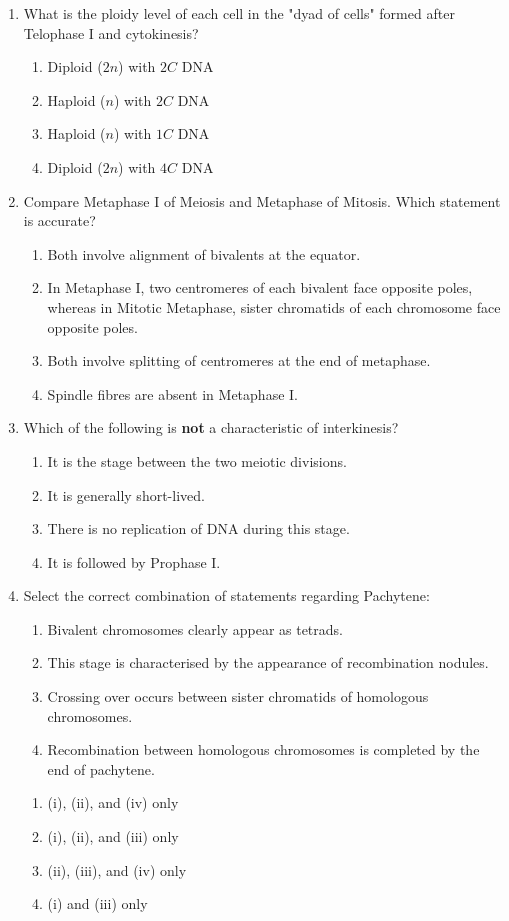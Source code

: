 \documentclass[11pt,a4paper]{article}
\begin{document}
\begin{enumerate}[label=\textbf{\arabic*.}]
\item What is the ploidy level of each cell in the "dyad of cells" formed after Telophase I and cytokinesis?
\begin{enumerate}[label=(\Alph*)]
    \item Diploid ($2n$) with $2C$ DNA
    \item Haploid ($n$) with $2C$ DNA
    \item Haploid ($n$) with $1C$ DNA
    \item Diploid ($2n$) with $4C$ DNA
\end{enumerate}

\item Compare Metaphase I of Meiosis and Metaphase of Mitosis. Which statement is accurate?
\begin{enumerate}[label=(\Alph*)]
    \item Both involve alignment of bivalents at the equator.
    \item In Metaphase I, two centromeres of each bivalent face opposite poles, whereas in Mitotic Metaphase, sister chromatids of each chromosome face opposite poles.
    \item Both involve splitting of centromeres at the end of metaphase.
    \item Spindle fibres are absent in Metaphase I.
\end{enumerate}

\item Which of the following is \textbf{not} a characteristic of interkinesis?
\begin{enumerate}[label=(\Alph*)]
    \item It is the stage between the two meiotic divisions.
    \item It is generally short-lived.
    \item There is no replication of DNA during this stage.
    \item It is followed by Prophase I.
\end{enumerate}

\item Select the correct combination of statements regarding Pachytene:
\begin{enumerate}[label=(\roman*)]
    \item Bivalent chromosomes clearly appear as tetrads.
    \item This stage is characterised by the appearance of recombination nodules.
    \item Crossing over occurs between sister chromatids of homologous chromosomes.
    \item Recombination between homologous chromosomes is completed by the end of pachytene.
\end{enumerate}
\begin{enumerate}[label=(\Alph*)]
    \item (i), (ii), and (iv) only
    \item (i), (ii), and (iii) only
    \item (ii), (iii), and (iv) only
    \item (i) and (iii) only
\end{enumerate}


\end{enumerate}
\end{document}
